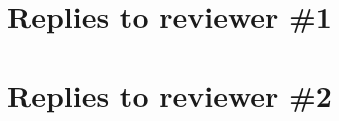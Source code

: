 \documentclass[11pt,final]{article}
\newcommand{\referee}[1]{\vspace{.1ex}\noindent{\textcolor{blue}{#1}}}
\begin{document}
\section{Replies to reviewer \#1}
%
%
%
%
%

\section{Replies to reviewer \#2}
\end{document}
